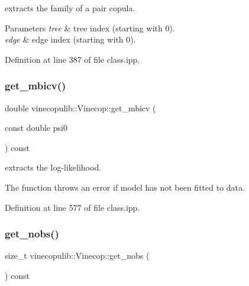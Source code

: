 extracts the family of a pair copula. 


\begin{DoxyParams}{Parameters}
{\em tree} & tree index (starting with 0). \\
\hline
{\em edge} & edge index (starting with 0). \\
\hline
\end{DoxyParams}


Definition at line 387 of file class.\+ipp.

\mbox{\label{classvinecopulib_1_1_vinecop_ad694a38fd514fe339e00a00093b5aa33}} 
\subsubsection{\texorpdfstring{get\+\_\+mbicv()}{get\_mbicv()}}
{\footnotesize\ttfamily double vinecopulib\+::\+Vinecop\+::get\+\_\+mbicv (\begin{DoxyParamCaption}\item[{const double}]{psi0 }\end{DoxyParamCaption}) const\hspace{0.3cm}{\ttfamily [inline]}}



extracts the log-\/likelihood. 

The function throws an error if model has not been fitted to data. 

Definition at line 577 of file class.\+ipp.

\mbox{\label{classvinecopulib_1_1_vinecop_a2260191b027249666f637dae58795a47}} 
\subsubsection{\texorpdfstring{get\+\_\+nobs()}{get\_nobs()}}
{\footnotesize\ttfamily size\+\_\+t vinecopulib\+::\+Vinecop\+::get\+\_\+nobs (\begin{DoxyParamCaption}{ }\end{DoxyParamCaption}) const\hspace{0.3cm}{\ttfamily [inline]}}



